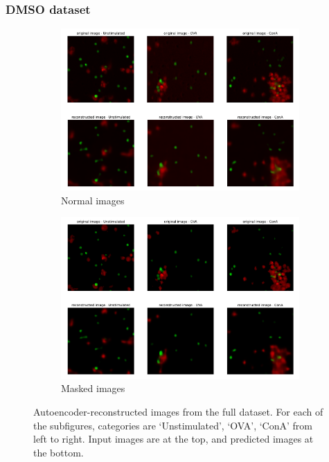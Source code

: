 \bigskip
\subsubsection{DMSO dataset}
\hfill
\hfill

\begin{figure}[h!]
    \centering
    \begin{subfigure}[h!]{0.45\textwidth}
        \includegraphics[width=\textwidth]{dissertation/figures/CK19_reconstruction.png}
        \caption{Normal images}
    \end{subfigure}
    \begin{subfigure}[h!]{0.45\textwidth}
        \includegraphics[width=\textwidth]{dissertation/figures/CK19_masked_reconstruction.png}
        \caption{Masked images}
    \end{subfigure}
    \caption{Autoencoder-reconstructed images from the full dataset. For each of the subfigures, categories are `Unstimulated', `OVA', `ConA' from left to right. Input images are at the top, and predicted images at the bottom.}
    \label{fig:my_label}
\end{figure}

